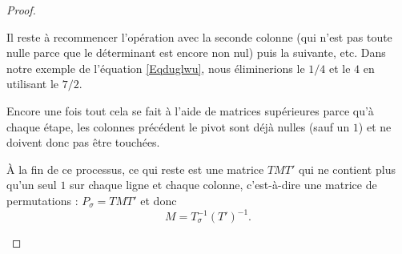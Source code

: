 \begin{proof}
\begin{subproof}
		Il reste à recommencer l'opération avec la seconde colonne (qui n'est pas toute nulle parce que le déterminant est encore non nul) puis la suivante, etc. Dans notre exemple de l'équation \eqref{Eqduglwu}, nous éliminerions le \( 1/4\) et le \( 4\) en utilisant le \( 7/2\).

		Encore une fois tout cela se fait à l'aide de matrices supérieures parce qu'à chaque étape, les colonnes précédent le pivot sont déjà nulles (sauf un \( 1\)) et ne doivent donc pas être touchées.

		À la fin de ce processus, ce qui reste est une matrice \( TMT'\) qui ne contient plus qu'un seul \( 1\) sur chaque ligne et chaque colonne, c'est-à-dire une matrice de permutations : \( P_{\sigma}=TMT'\) et donc
		\begin{equation}
			M=T^{-1}_{\sigma}(T')^{-1}.
		\end{equation}

		\spitem[Unicité]


\end{subproof}
\end{proof}
